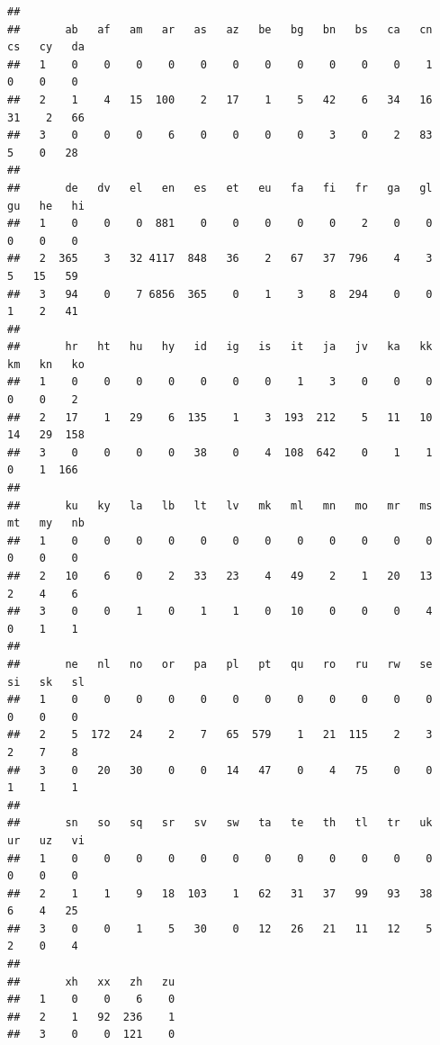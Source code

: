 \documentclass[
]{article}
\newenvironment{Shaded}{\begin{snugshade}}{\end{snugshade}}
\newcommand{\CommentTok}[1]{\textcolor[rgb]{0.56,0.35,0.01}{\textit{#1}}}
\newcommand{\FunctionTok}[1]{\textcolor[rgb]{0.13,0.29,0.53}{\textbf{#1}}}
\newcommand{\NormalTok}[1]{#1}
\newcommand{\OtherTok}[1]{\textcolor[rgb]{0.56,0.35,0.01}{#1}}
\newcommand{\SpecialCharTok}[1]{\textcolor[rgb]{0.81,0.36,0.00}{\textbf{#1}}}
\begin{document}
\begin{Shaded}
\end{Shaded}

\begin{verbatim}
##    
##       ab   af   am   ar   as   az   be   bg   bn   bs   ca   cn   cs   cy   da
##   1    0    0    0    0    0    0    0    0    0    0    0    1    0    0    0
##   2    1    4   15  100    2   17    1    5   42    6   34   16   31    2   66
##   3    0    0    0    6    0    0    0    0    3    0    2   83    5    0   28
##    
##       de   dv   el   en   es   et   eu   fa   fi   fr   ga   gl   gu   he   hi
##   1    0    0    0  881    0    0    0    0    0    2    0    0    0    0    0
##   2  365    3   32 4117  848   36    2   67   37  796    4    3    5   15   59
##   3   94    0    7 6856  365    0    1    3    8  294    0    0    1    2   41
##    
##       hr   ht   hu   hy   id   ig   is   it   ja   jv   ka   kk   km   kn   ko
##   1    0    0    0    0    0    0    0    1    3    0    0    0    0    0    2
##   2   17    1   29    6  135    1    3  193  212    5   11   10   14   29  158
##   3    0    0    0    0   38    0    4  108  642    0    1    1    0    1  166
##    
##       ku   ky   la   lb   lt   lv   mk   ml   mn   mo   mr   ms   mt   my   nb
##   1    0    0    0    0    0    0    0    0    0    0    0    0    0    0    0
##   2   10    6    0    2   33   23    4   49    2    1   20   13    2    4    6
##   3    0    0    1    0    1    1    0   10    0    0    0    4    0    1    1
##    
##       ne   nl   no   or   pa   pl   pt   qu   ro   ru   rw   se   si   sk   sl
##   1    0    0    0    0    0    0    0    0    0    0    0    0    0    0    0
##   2    5  172   24    2    7   65  579    1   21  115    2    3    2    7    8
##   3    0   20   30    0    0   14   47    0    4   75    0    0    1    1    1
##    
##       sn   so   sq   sr   sv   sw   ta   te   th   tl   tr   uk   ur   uz   vi
##   1    0    0    0    0    0    0    0    0    0    0    0    0    0    0    0
##   2    1    1    9   18  103    1   62   31   37   99   93   38    6    4   25
##   3    0    0    1    5   30    0   12   26   21   11   12    5    2    0    4
##    
##       xh   xx   zh   zu
##   1    0    0    6    0
##   2    1   92  236    1
##   3    0    0  121    0
\end{verbatim}
\end{document}
